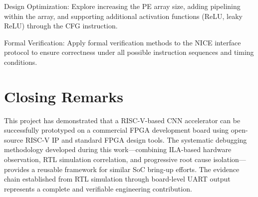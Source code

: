 Design Optimization: Explore increasing the PE array size, adding pipelining within the array, and supporting additional activation functions (ReLU, leaky ReLU) through the CFG instruction.


Formal Verification: Apply formal verification methods to the NICE interface protocol to ensure correctness under all possible instruction sequences and timing conditions.


\section{Closing Remarks}\label{sec:6_4}

This project has demonstrated that a RISC-V-based CNN accelerator can be successfully prototyped on a commercial FPGA development board using open-source RISC-V IP and standard FPGA design tools. The systematic debugging methodology developed during this work---combining ILA-based hardware observation, RTL simulation correlation, and progressive root cause isolation---provides a reusable framework for similar SoC bring-up efforts. The evidence chain established from RTL simulation through board-level UART output represents a complete and verifiable engineering contribution.


